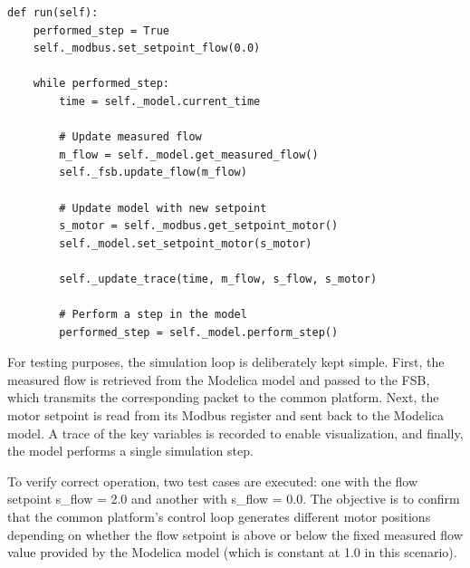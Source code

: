 \documentclass[we,final,11pt,oneside,openany]{uantwerpenbamathesis}
\begin{document}
\newpage

\begin{lstlisting}[style=pythonstyle, caption={Simulation loop}]
def run(self):
    performed_step = True
    self._modbus.set_setpoint_flow(0.0)

    while performed_step:
        time = self._model.current_time

        # Update measured flow
        m_flow = self._model.get_measured_flow()
        self._fsb.update_flow(m_flow)

        # Update model with new setpoint
        s_motor = self._modbus.get_setpoint_motor()
        self._model.set_setpoint_motor(s_motor)

        self._update_trace(time, m_flow, s_flow, s_motor)

        # Perform a step in the model
        performed_step = self._model.perform_step()
\end{lstlisting}

For testing purposes, the simulation loop is deliberately kept simple.
First, the measured flow is retrieved from the Modelica model and passed to the FSB, which transmits the corresponding packet to the common platform.
Next, the motor setpoint is read from its Modbus register and sent back to the Modelica model.
A trace of the key variables is recorded to enable visualization, and finally, the model performs a single simulation step.

To verify correct operation, two test cases are executed: one with the flow setpoint s\_flow = 2.0 and another with s\_flow = 0.0.
The objective is to confirm that the common platform’s control loop generates different motor positions depending on whether the flow setpoint is above or below the fixed measured flow value provided by the Modelica model (which is constant at 1.0 in this scenario).
\end{document}

